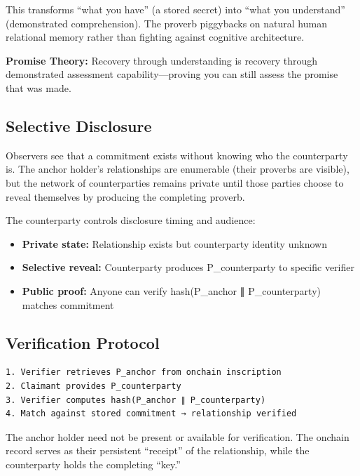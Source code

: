\documentclass[
]{article}
\providecommand{\tightlist}{%
  \setlength{\itemsep}{0pt}\setlength{\parskip}{0pt}}
\begin{document}
This transforms ``what you have'' (a stored secret) into ``what you
understand'' (demonstrated comprehension). The proverb piggybacks on
natural human relational memory rather than fighting against cognitive
architecture.

\textbf{Promise Theory:} Recovery through understanding is recovery
through demonstrated assessment capability---proving you can still
assess the promise that was made.

\subsection{Selective Disclosure}\label{selective-disclosure}

Observers see that a commitment exists without knowing who the
counterparty is. The anchor holder's relationships are enumerable (their
proverbs are visible), but the network of counterparties remains private
until those parties choose to reveal themselves by producing the
completing proverb.

The counterparty controls disclosure timing and audience:

\begin{itemize}
\tightlist
\item
  \textbf{Private state:} Relationship exists but counterparty identity
  unknown
\item
  \textbf{Selective reveal:} Counterparty produces P\_counterparty to
  specific verifier
\item
  \textbf{Public proof:} Anyone can verify hash(P\_anchor ∥
  P\_counterparty) matches commitment
\end{itemize}

\subsection{Verification Protocol}\label{verification-protocol}

\begin{verbatim}
1. Verifier retrieves P_anchor from onchain inscription
2. Claimant provides P_counterparty
3. Verifier computes hash(P_anchor ∥ P_counterparty)
4. Match against stored commitment → relationship verified
\end{verbatim}

The anchor holder need not be present or available for verification. The
onchain record serves as their persistent ``receipt'' of the
relationship, while the counterparty holds the completing ``key.''
\end{document}
